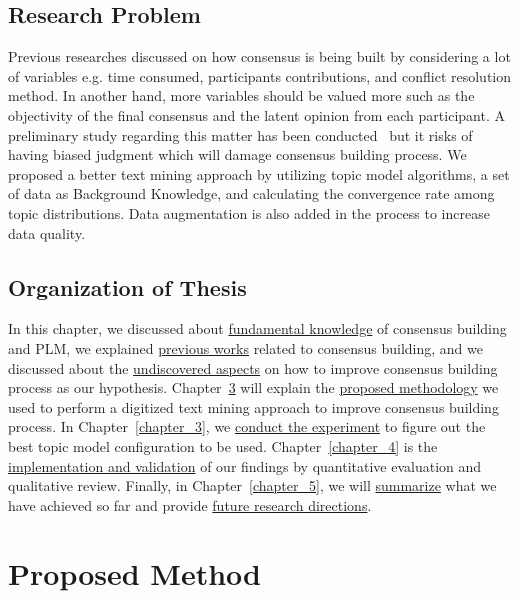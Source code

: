 \documentclass[senior]{IPSstyle}
\begin{document}
\section{Research Problem}

Previous researches discussed on how consensus is being built by considering a lot of variables e.g. time consumed, participants contributions, and conflict resolution method. In another hand, more variables should be valued more such as the objectivity of the final consensus and the latent opinion from each participant. A preliminary study regarding this matter has been conducted~\cite{goto2} but it risks of having biased judgment which will damage consensus building process. We proposed a better text mining approach by utilizing topic model algorithms, a set of data as Background Knowledge, and calculating the convergence rate among topic distributions. Data augmentation is also added in the process to increase data quality.

\section{Organization of Thesis}

In this chapter, we discussed about \underline{fundamental knowledge} of consensus building and PLM, we explained \underline{previous works} related to consensus building, and we discussed about the \underline{undiscovered aspects} on how to improve consensus building process as our hypothesis. Chapter~\ref{chapter_2} will explain the \underline{proposed methodology} we used to perform a digitized text mining approach to improve consensus building process. In Chapter~\ref{chapter_3}, we \underline{conduct the experiment} to figure out the best topic model configuration to be used. Chapter~\ref{chapter_4} is the \underline{implementation and validation} of our findings by quantitative evaluation and qualitative review. Finally, in Chapter~\ref{chapter_5}, we will \underline{summarize} what we have achieved so far and provide \underline{future research directions}.

\chapter{Proposed Method} 
\label{chapter_2}
\end{document}
